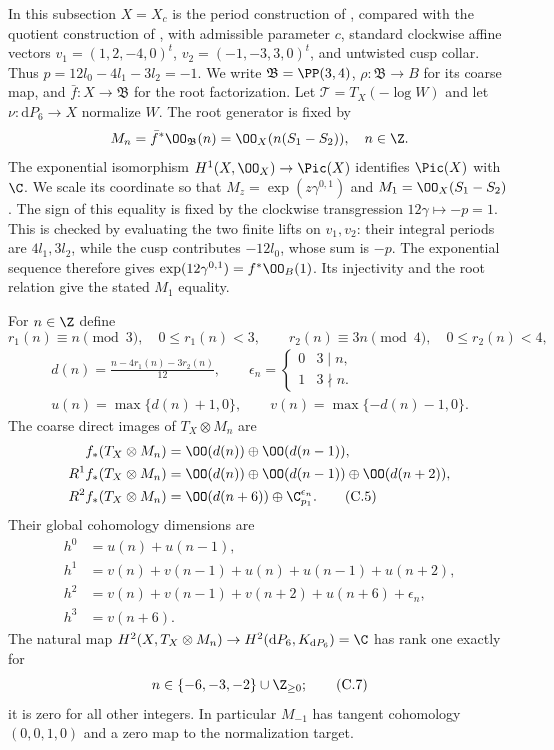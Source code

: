 
In this subsection $X=X_c$ is the period construction of \cite{AC26}, compared with the quotient construction of \cite{Engel2026}, with admissible parameter $c$, standard clockwise affine vectors
$v_1=(1,2,-4,0)^t$, $v_2=(-1,-3,3,0)^t$, and untwisted cusp collar. Thus $p=12l_0-4l_1-3l_2=-1$. We write $\mathfrak B=\PP(3,4)$, $\rho:\mathfrak B\to B$ for its coarse map, and $\bar f:X\to\mathfrak B$ for the root factorization. Let $\mathcal T=T_X(-\log W)$ and let $\nu:\mathrm dP_6\to X$ normalize $W$. The root generator is fixed by
\[
 M_n=\bar f^*\OO_{\mathfrak B}(n)
     =\OO_X(n(S_1-S_2)),\quad n\in\Z.
\]
The exponential isomorphism $H^1(X,\OO_X)\to\Pic(X)$ identifies $\Pic(X)$ with $\C$. We scale its coordinate so that $M_z=\exp(z\gamma^{0,1})$ and $M_1=\OO_X(S_1-S_2)$. The sign of this equality is fixed by the clockwise transgression $12\gamma\mapsto-p=1$. This is checked by evaluating the two finite lifts on $v_1,v_2$: their integral periods are $4l_1,3l_2$, while the cusp contributes $-12l_0$, whose sum is $-p$. The exponential sequence therefore gives $\exp(12\gamma^{0,1})=f^*\OO_B(1)$. Its injectivity and the root relation give the stated $M_1$ equality.

\begin{proposition}\label{cdp:st:C5b}
For $n\in\Z$ define
\[
 r_1(n)\equiv n\pmod3,\quad 0\le r_1(n)<3,
 \qquad r_2(n)\equiv3n\pmod4,\quad0\le r_2(n)<4,
\]
\begin{gather*}
 d(n)=\frac{n-4r_1(n)-3r_2(n)}{12},\qquad
 \epsilon_n=\begin{cases}0&3\mid n,\\1&3\nmid n.\end{cases}
\\
 u(n)=\max\{d(n)+1,0\},\qquad
 v(n)=\max\{-d(n)-1,0\}.
\end{gather*}
The coarse direct images of $T_X\otimes M_n$ are
\begin{align*}
 f_*(T_X\otimes M_n)&=\OO(d(n))\oplus\OO(d(n-1)),\\
 R^1f_*(T_X\otimes M_n)&=\OO(d(n))\oplus\OO(d(n-1))\oplus\OO(d(n+2)),\\
 R^2f_*(T_X\otimes M_n)&=\OO(d(n+6))\oplus\C_{p_1}^{\epsilon_n}.\tag{C.5}\label{cdp:eq:C.5}
\end{align*}
Their global cohomology dimensions are
\begin{align*}
 h^0&=u(n)+u(n-1),\\
 h^1&=v(n)+v(n-1)+u(n)+u(n-1)+u(n+2),\\
 h^2&=v(n)+v(n-1)+v(n+2)+u(n+6)+\epsilon_n,\\
 h^3&=v(n+6).                                             \tag{C.6}\label{cdp:eq:C.6}
\end{align*}
The natural map $H^2(X,T_X\otimes M_n)\to H^2(\mathrm dP_6,K_{\mathrm dP_6})=\C$ has rank one exactly for
\[
 n\in\{-6,-3,-2\}\cup\Z_{\ge0};                         \tag{C.7}\label{cdp:eq:C.7}
\]
it is zero for all other integers. In particular $M_{-1}$ has tangent cohomology $(0,0,1,0)$ and a zero map to the normalization target.
\end{proposition}

